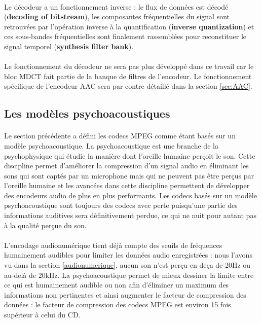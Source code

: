 \documentclass{article}
\begin{document}
    \paragraph{}
    Le décodeur a un fonctionnement inverse : le flux de données est décodé (\textbf{decoding of bitstream}), les composantes fréquentielles du signal sont retrouvées par l'opération inverse à la quantification (\textbf{inverse quantization}) et ces sous-bandes fréquentielles sont finalement rassemblées pour reconstituer le signal temporel (\textbf{synthesis filter bank}).

    \paragraph{}
    Le fonctionnement du décodeur ne sera pas plus développé dans ce travail car le bloc MDCT fait partie de la banque de filtres de l'encodeur. Le fonctionnement spécifique de l'encodeur AAC sera par contre détaillé dans la section \ref{sec:AAC}.


    \subsection{Les modèles psychoacoustiques}
    \paragraph{}
    Le section précédente a défini les codecs MPEG comme étant basés sur un modèle psychoacoustique. La psychoacoustique est une branche de la psychophysique qui étudie la manière dont l'oreille humaine perçoit le son\cite{wiki:psychoacoustic}. Cette discipline permet d'améliorer la compression d'un signal audio en éliminant les sons qui sont captés par un microphone mais qui ne peuvent pas être perçus par l'oreille humaine et les avancées dans cette discipline permettent de développer des encodeurs audio de plus en plus performants. Les codecs basés sur un modèle psychoacoustique sont toujours des codecs avec perte puisqu'une partie des informations auditives sera définitivement perdue, ce qui ne nuit pour autant pas à la qualité perçue du son.

    \paragraph{}
    L'encodage audionumérique tient déjà compte des seuils de fréquences humainement audibles pour limiter les données audio enregistrées : nous l'avons vu dans la section \ref{audionumerique}, aucun son n'est perçu en-deça de 20Hz ou au-delà de 20kHz. La psychoacoustique permet de mieux dessiner la limite entre ce qui est humainement audible ou non afin d'éliminer un maximum des informations non pertinentes et ainsi augmenter le facteur de compression des données : le facteur de compression des codecs MPEG est environ 15 fois supérieur à celui du CD\cite{2019-Herre-Dick}.
\end{document}
